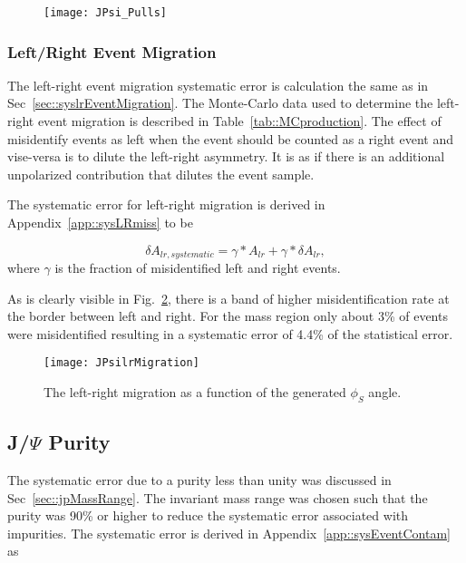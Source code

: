 \begin{figure}[h!t]
  \centering \texttt{[image: JPsi\_Pulls]}
  \caption{}
  \label{fig::JPsi_Pulls}
\end{figure}


\subsubsection{Left/Right Event Migration}
The left-right event migration systematic error is calculation the same as in
Sec~\ref{sec::syslrEventMigration}.  The Monte-Carlo data used to determine the
left-right event migration is described in Table~\ref{tab::MCproduction}.  The
effect of misidentify events as left when the event should be counted as a right
event and vise-versa is to dilute the left-right asymmetry.  It is as if there
is an additional unpolarized contribution that dilutes the event sample.

The systematic error for left-right migration is derived in
Appendix~\ref{app::sysLRmiss} to be

\begin{equation}
  \delta A_{lr,systematic} = \gamma *A_{lr} + \gamma *\delta A_{lr},
\end{equation}
\noindent
where $\gamma$ is the fraction of misidentified left and right events.  

As is clearly visible in Fig.~\ref{fig::JPsilrMigration}, there is a band of
higher misidentification rate at the border between left and right.  For the
{\jp} mass region only about 3\% of events were misidentified resulting in a
systematic error of 4.4\% of the statistical error.

\begin{figure}[h!t]
  \centering \texttt{[image: JPsilrMigration]}
  \caption{The left-right migration as a function of the generated $\phi_S$
    angle.}
  \label{fig::JPsilrMigration}
\end{figure}

\subsection{J/$\Psi$ Purity}

The systematic error due to a {\jp} purity less than unity was discussed in
Sec~\ref{sec::jpMassRange}.  The invariant mass range was chosen such that the
{\jp} purity was 90\% or higher to reduce the systematic error associated with
impurities.  The systematic error is derived in
Appendix~\ref{app::sysEventContam} as

